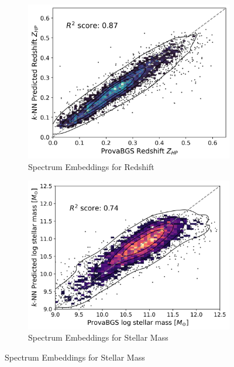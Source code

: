 \documentclass[a4paper,12pt]{article}
\begin{document}
\begin{figure}[H]
    \begin{subfigure}[b]{0.48\textwidth}
        \centering
        \includegraphics[width=\textwidth]{../figures/zeroshot_redshift_spectrum.png}
        \caption{Spectrum Embeddings for Redshift}
        \label{fig:redshift_spectrum}
    \end{subfigure}%
    \hfill
    \begin{subfigure}[b]{0.48\textwidth}
        \centering
        \includegraphics[width=\textwidth]{../figures/zeroshot_stellarmass_spectrum.png}
        \caption{Spectrum Embeddings for Stellar Mass}
        \label{fig:stellarmass_spectrum}
    \end{subfigure}


\end{figure}
\end{document}
